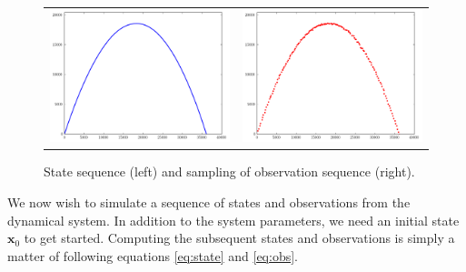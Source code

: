 \begin{figure}
    \centering
    \begin{tabular}{cc}
    \includegraphics[width=.45\textwidth]{states_evolution} &
    \includegraphics[width=.45\textwidth]{obs_evolution}
    \end{tabular}
    \caption{State sequence (left) and sampling of observation sequence (right).}
    \label{fig:evolution}
\end{figure}

We now wish to simulate a sequence of states and observations from the dynamical system.
In addition to the system parameters, we need an initial state $\mathbf{x}_0$ to get started.
Computing the subsequent states and observations is simply a matter of following equations \ref{eq:state} and \ref{eq:obs}.

